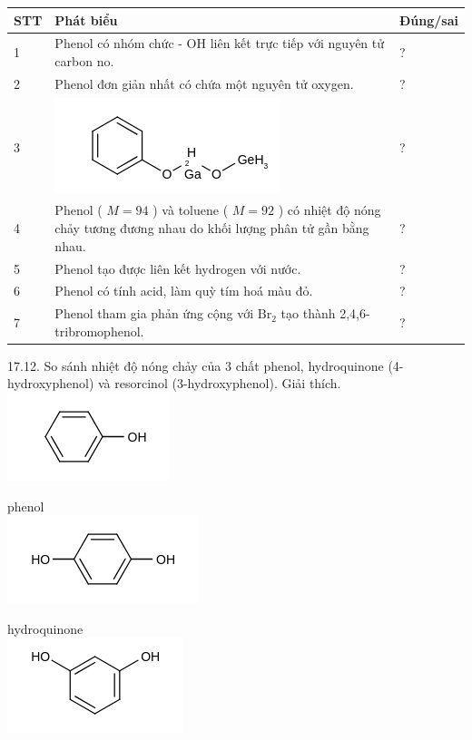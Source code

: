 \documentclass[10pt]{article}
\begin{document}
\begin{center}
\begin{tabular}{|l|l|l|}
\hline
STT & Phát biểu & Đúng/sai \\
\hline
1 & Phenol có nhóm chức - OH liên kết trực tiếp với nguyên tử carbon no. & ? \\
\hline
2 & Phenol đơn giản nhất có chứa một nguyên tử oxygen. & ? \\
\hline
3 & \includegraphics{smile-0a8ab4fcb834653d28d9b6ef71b2c0343da3c2be} & ? \\
\hline
4 & Phenol ( $M=94$ ) và toluene ( $M=92$ ) có nhiệt độ nóng chảy tương đương nhau do khối lượng phân tử gần bằng nhau. & ? \\
\hline
5 & Phenol tạo được liên kết hydrogen với nước. & ? \\
\hline
6 & Phenol có tính acid, làm quỳ tím hoá màu đỏ. & ? \\
\hline
7 & Phenol tham gia phản ứng cộng với $\mathrm{Br}_{2}$ tạo thành 2,4,6-tribromophenol. & ? \\
\hline
\end{tabular}
\end{center}

17.12. So sánh nhiệt độ nóng chảy của 3 chất phenol, hydroquinone (4-hydroxyphenol) và resorcinol (3-hydroxyphenol). Giải thích.\\
\includegraphics{smile-2a0fe5a2ae3d6e530b0d291a4a3e7536729c47ca}

phenol\\
\includegraphics{smile-7c348b6005f683a5436a4c6a6d9d5bdea2f6de90}

hydroquinone\\
\includegraphics{smile-7a9ace0f9a02259cc797343936ff0625dcac09c4}
\end{document}
